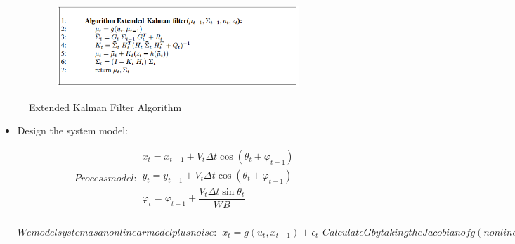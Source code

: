 \documentclass{article}
\begin{document}
\begin{figure}[!h]
    \centering
    \begin{subfigure}[b]{0.6\textwidth}
        \includegraphics[width=\textwidth]{../Algorithm-EKF.PNG}
        \label{fig:image-4}
    \end{subfigure}
\caption{Extended Kalman Filter Algorithm}
\end{figure}

\begin{itemize}
	\item{Design the system model:} 
	\begin{itemize}
		\begin{subequations} 
		Process model:
		\begin{align}
			x_t = x_{t-1} + V_t\Delta{t}\cos\left({\theta_t + \varphi_{t-1}}\right) \\
			y_t = y_{t-1} + V_t\Delta{t}\cos\left({\theta_t + \varphi_{t-1}}\right) \\
			\varphi_t = \varphi_{t-1} + \dfrac{V_t\Delta{t}\sin{\theta_t}}{WB}
		\end{align}
		\end{subequations}
		\begin{subequations} 
		We model system as a nonlinear model plus noise:
		\begin{align}
			x_t = g\left({u_t,x_{t-1}}\right)+ \epsilon_t 			
		\end{align}
		Calculate G by taking the Jacobian of g (nonlinear function):
	
		\begin{align*}
		G=
    		\begin{bmatrix}
        	1 & 0 & -R\cos\left({\theta}\right)+ R\cos\left({\theta+ \varphi}\right) \\
        	0 & 1 & -R\sin\left({\theta}\right)+ R\sin\left({\theta+ \varphi}\right) \\
        	0 & 0 & 1
    		\end{bmatrix}
		\end{align*}
		\end{subequations}

		\end{itemize}
\end{itemize}
\end{document}
